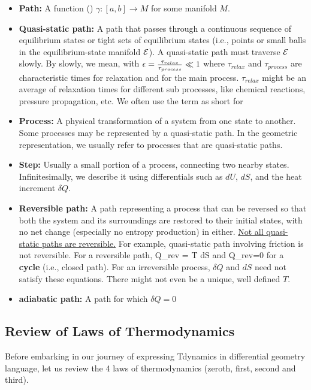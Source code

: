 \begin{itemize}
\item
{\bf Path:}  A function () $\gamma:[a,b]\to M$
for some manifold $M$.

\item {\bf Quasi-static path:} A path that passes through a continuous sequence of equilibrium states  or tight sets of equilibrium states (i.e., points or small balls in the equilibrium-state manifold ${\cal E}$). A quasi-static path must traverse ${\cal E}$ slowly. By slowly, we mean, with $\epsilon=\frac{\tau_{relax}}{\tau_{process}} \ll 1$ where $\tau_{relax}$ and $\tau_{process}$ are characteristic times for relaxation and for the main process. $\tau_{relax}$ might be an average of relaxation times for different sub processes, like chemical reactions, pressure propagation, etc.
We often use the term 
as short for 

\item {\bf Process:} A physical transformation of a system from one state to another. Some processes may be represented by a quasi-static path.
In the geometric representation,
we usually refer to processes that are quasi-static paths. 


\item {\bf Step:} Usually a small portion of a process, connecting two nearby states. Infinitesimally, we describe it using differentials such as $dU$, $dS$, and the heat increment $\delta Q$.



\item {\bf Reversible path:} A path representing a process that can be reversed so that both the system and its surroundings are restored to their initial states, with no net change (especially no  entropy
production) in either.
\ul{Not all quasi-static paths are reversible.}
For example, quasi-static path involving friction is not  reversible.
For a reversible path, 
\beq
\delta Q_{rev} = T dS
\eeq
and 
\beq
\oint \delta Q_{rev}=0
\eeq
for a {\bf cycle} (i.e., closed path).
For an irreversible process, $\delta Q$ and $dS$ need not satisfy these equations. There might not even be a
unique, well defined $T$.

\item {\bf adiabatic path:} A path for which $\delta Q=0$

\end{itemize}

\subsection{Review of Laws of Thermodynamics}
Before embarking in our journey 
of expressing Tdynamics in differential geometry language,
let us review the 4 laws of thermodynamics (zeroth, first, second and third).



